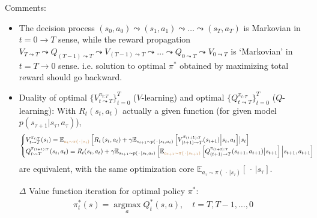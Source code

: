 Comments:
\begin{itemize}[topsep=2pt,itemsep=0pt]
    \item The decision process $(s_0,a_0)\leadsto (s_1,a_1)\leadsto\ldots\leadsto (s_T,a_T) $
    is Markovian in $ t=0\to T $ sense, while the reward propagation $ V_{T\leadsto T}\leadsto Q_{(T-1)\leadsto T}\leadsto V_{(T-1)\leadsto T}\leadsto \ldots\leadsto Q_{0\leadsto T}\leadsto V_{0\leadsto T} $ is `Markovian' in $t= T\to 0 $ sense. i.e. solution to optimal $ \pi^* $ obtained by maximizing total reward should go backward.
    \item Duality of optimal $ \{V_{t\leadsto T}^{\pi_{t:T}}\}_{t=0}^T $ ($ V $-learning) and optimal $ \{Q_{t\leadsto T}^{\pi_{t:T}}\}_{t=0}^{T} $ ($ Q $-learning): With $ R_{t}(s_t,a_t) $ actually a given function (for given model $ p(s_{\tau+1}|s_\tau,a_\tau) $),
    \begin{align}
        \begin{cases}
            V_{t\leadsto T}^{\pi_{t:T}}(s_t)={\mathbb{E}_{\color{brown}a_t\sim \pi(\, \cdot \, |s_t)}\left[{R_{t}\left(s_t,a_t\right)+  \gamma\mathbb{E}_{s_{t+1}\sim p\left(\, \cdot \, |s_t,a_t\right)}\left[{\color{black}  V_{(t+1)\leadsto T}^{\pi_{(t+1):T}} (s_{t+1})} \Big| s_t,a_t \right]}  \big|s_t\right]}\\
            Q_{t\leadsto T}^{\pi_{(t+1):T}}(s_t,a_t)=R_t(s_t,a_t)+\gamma \mathbb{E}_{s_{t+1}\sim p\left(\, \cdot \, |s_t,a_t\right)}\left[ \mathbb{E}_{\color{brown}a_{t+1}\sim \pi(\, \cdot \, |s_{t+1})}\left[ Q_{(t+1)\leadsto T}^{\pi_{(t+2):T}}(s_{t+1},a_{t+1})  \big|s_{t+1}\right]  \Big| s_{t+1},a_{t+1}\right]
        \end{cases} 
    \end{align}
    are equivalent, with the same optimization core $ \mathbb{E}_{a_\tau\sim\pi(\, \cdot \, |s_\tau)}\left[ \, \cdot \,  |s_\tau \right]  $. 
    \item[$ \Delta  $] Value function iteration for optimal policy $ \pi^* $:
    \begin{align}
        \pi^*_t(s)=\mathop{\arg\max}\limits_{a} Q_t^*(s,a) ,\quad t=T,T-1,\ldots,0
    \end{align}
    
\end{itemize}
